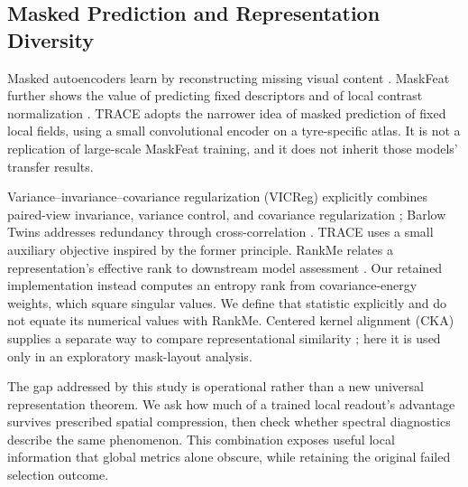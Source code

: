 \subsection{Masked Prediction and Representation Diversity}
Masked autoencoders learn by reconstructing missing visual content \cite{mae}. MaskFeat further shows the value of predicting fixed descriptors and of local contrast normalization \cite{maskfeat}. TRACE adopts the narrower idea of masked prediction of fixed local fields, using a small convolutional encoder on a tyre-specific atlas. It is not a replication of large-scale MaskFeat training, and it does not inherit those models' transfer results.

Variance--invariance--covariance regularization (VICReg) explicitly combines paired-view invariance, variance control, and covariance regularization \cite{vicreg}; Barlow Twins addresses redundancy through cross-correlation \cite{barlow}. TRACE uses a small auxiliary objective inspired by the former principle. RankMe relates a representation's effective rank to downstream model assessment \cite{rankme}. Our retained implementation instead computes an entropy rank from covariance-energy weights, which square singular values. We define that statistic explicitly and do not equate its numerical values with RankMe. Centered kernel alignment (CKA) supplies a separate way to compare representational similarity \cite{cka}; here it is used only in an exploratory mask-layout analysis.

The gap addressed by this study is operational rather than a new universal representation theorem. We ask how much of a trained local readout's advantage survives prescribed spatial compression, then check whether spectral diagnostics describe the same phenomenon. This combination exposes useful local information that global metrics alone obscure, while retaining the original failed selection outcome.
